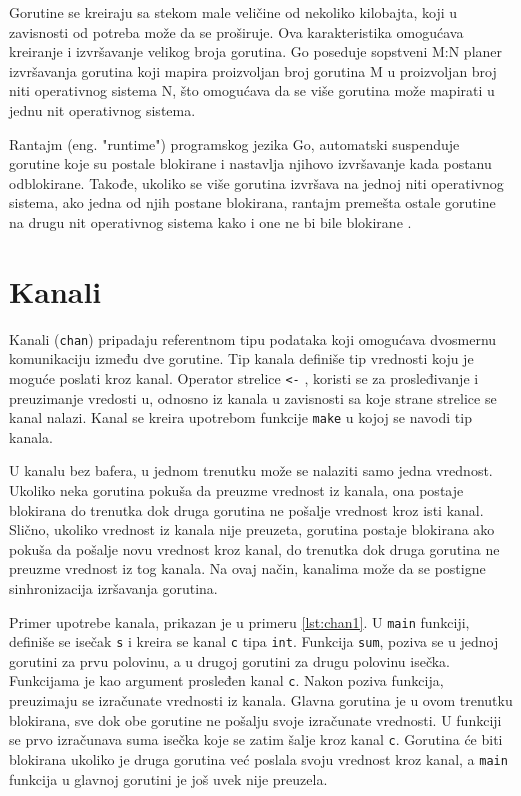 \documentclass[12pt,oneside]{memoir}
\begin{document}
Gorutine se kreiraju sa stekom male veličine od nekoliko kilobajta, koji u zavisnosti od potreba može da se proširuje. Ova karakteristika omogućava kreiranje i izvršavanje velikog broja gorutina. Go poseduje sopstveni M:N planer izvršavanja gorutina koji mapira proizvoljan broj gorutina M u proizvoljan broj niti operativnog sistema N, što omogućava da se više gorutina može mapirati u jednu nit operativnog sistema. 

Rantajm (eng. "runtime") programskog jezika Go, automatski suspenduje gorutine koje su postale blokirane i nastavlja njihovo izvršavanje kada postanu odblokirane. Takođe, ukoliko se više gorutina izvršava na jednoj niti operativnog sistema, ako jedna od njih postane blokirana, rantajm premešta ostale gorutine na drugu nit operativnog sistema kako i one ne bi bile blokirane \cite{bookConc}. 

\section{Kanali} \label{chanel}

Kanali (\texttt{chan}) pripadaju referentnom tipu podataka koji omogućava dvosmernu komunikaciju između dve gorutine. Tip kanala definiše tip vrednosti koju je moguće poslati kroz kanal. Operator strelice \texttt{<-} , koristi se za prosleđivanje i preuzimanje vredosti u, odnosno iz kanala u zavisnosti sa koje strane strelice se kanal nalazi. Kanal se kreira upotrebom funkcije \texttt{make} u kojoj se navodi tip kanala.

U kanalu bez bafera, u jednom trenutku može se nalaziti samo jedna vrednost. Ukoliko neka gorutina pokuša da preuzme vrednost iz kanala, ona postaje blokirana do trenutka dok druga gorutina ne pošalje vrednost kroz isti kanal. Slično, ukoliko vrednost iz kanala nije preuzeta, gorutina postaje blokirana ako pokuša da pošalje novu vrednost kroz kanal, do trenutka dok druga gorutina ne preuzme vrednost iz tog kanala. Na ovaj način, kanalima može da se postigne sinhronizacija izršavanja gorutina.

Primer upotrebe kanala, prikazan je u primeru \ref{lst:chan1}. U \texttt{main} funkciji, definiše se isečak \texttt{s} i kreira se kanal \texttt{c} tipa \texttt{int}. Funkcija \texttt{sum}, poziva se u jednoj gorutini za prvu polovinu, a u drugoj gorutini za drugu polovinu isečka. Funkcijama je kao argument prosleđen kanal \texttt{c}. Nakon poziva funkcija, preuzimaju se izračunate vrednosti iz kanala. Glavna gorutina je u ovom trenutku blokirana, sve dok obe gorutine ne pošalju svoje izračunate vrednosti. U funkciji se prvo izračunava suma isečka koje se zatim šalje kroz kanal \texttt{c}. Gorutina će biti blokirana ukoliko je druga gorutina već poslala svoju vrednost kroz kanal, a \texttt{main} funkcija u glavnoj gorutini je još uvek nije preuzela. 
\end{document}
